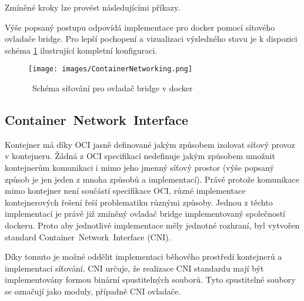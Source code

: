 Zmíněné kroky lze provést následujícími příkazy.



Výše popsaný postupu odpovídá implementace pro docker pomocí sítového ovladače bridge. Pro lepší pochopení a vizualizaci výsledného stavu je k dispozici schéma \ref{img:ContainerNetworking} ilustrující kompletní konfiguraci.\\

\begin{figure}[ht]
\centering
\texttt{[image: images/ContainerNetworking.png]}
\caption{~Schéma síťování pro ovladač bridge v docker}\label{img:ContainerNetworking}
\cite{velichko_2020_connecting}
\end{figure}

\subsection{Container~Network~Interface}\label{cni}
Kontejner má díky OCI jasně definované jakým způsobem izolovat síťový provoz v kontejneru. Žádná z OCI specifikací nedefinuje jakým způsobem umožnit kontejnerům komunikaci i mimo jeho jmenný síťový prostor (výše popsaný způsob je jen jeden z mnoha způsobů a implementací). Právě protože komunikace mimo kontejner není součástí specifikace OCI, různé implementace kontejnerových řešení řeší problematiku různými způsoby. Jednou z těchto implementací je právě již zmíněný ovladač bridge implementovaný společností dockeru. Proto aby jednotlivé implementace měly jednotné rozhraní, byl vytvořen standard Container~Network~Interface (CNI).

Díky tomuto je možné oddělit implementaci běhového prostředí kontejnerů a implementaci síťování. CNI určuje, že realizace CNI standardu mají být implementovány formou binární spustitelných souborů. Tyto spustitelné soubory se označují jako moduly, případně CNI ovladače.

